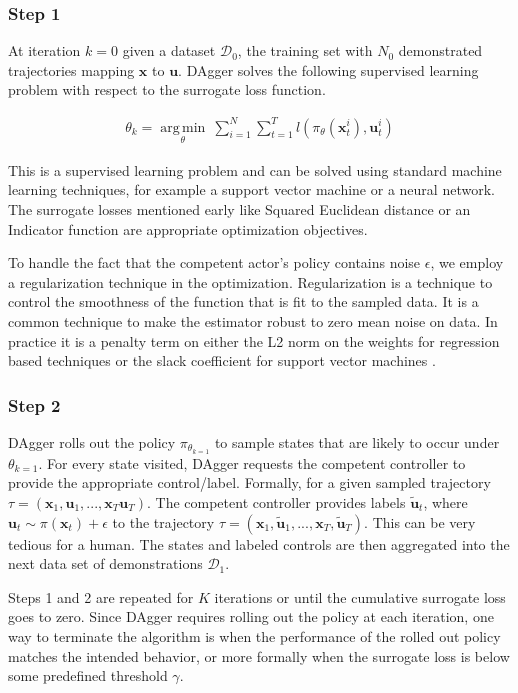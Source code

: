 \documentclass[10pt, conference]{ieeeconf}      %
\DeclareMathOperator*{\argmin}{arg\,min}
\newcommand{\bu}{\mathbf{u}}
\newcommand{\bx}{\mathbf{x}}
\begin{document}
\subsubsection{Step 1}
At iteration $k=0$ given a dataset $\mathcal{D}_0$, the training set with $N_0$ demonstrated trajectories mapping $\bx$ to $\bu$. DAgger solves the following supervised learning problem with respect to the surrogate loss function. 

 \vspace{-2ex}
\begin{align}\label{eq:super_objj}
\theta_{k} = \underset{\theta}{\argmin} \: \sum_{i=1}^{N}\sum_{t=1}^T l(\pi_{\theta}(\bx_t^{i}),\bu_{t}^i)
\end{align}
 
 
This is a supervised learning problem and can be solved using standard machine learning techniques, for example a support vector machine or a neural network. The surrogate losses mentioned early like Squared Euclidean distance or an Indicator function are appropriate optimization objectives. 
 
 To handle the fact that the competent actor's policy contains noise $\epsilon$, we employ a regularization technique in the optimization. Regularization is a technique to control the smoothness of the function that is fit to the sampled data. It is a common technique to make the estimator robust to zero mean noise on data. In practice it is a penalty term on either  the L2 norm on the weights for regression based techniques or the slack coefficient for support vector machines \cite{scholkopf2002learning}.
 
 \subsubsection{Step 2}
DAgger rolls out the policy $\pi_{\theta_{k=1}}$ to sample states that are likely to occur under $\theta_{k=1}$. For every state visited, DAgger requests the competent controller to provide the appropriate control/label. Formally, for a given sampled trajectory  $\tau = (\bx_1,\bu_1,...,\bx_T\bu_T )$. The competent controller provides labels $\tilde{\bu}_t$, where $\bu_t \sim \pi(\bx_t) + \epsilon$ to the trajectory $\tau = (\bx_1,\tilde{\bu}_1,...,\bx_T, \tilde{\bu}_T )$.  This can be very tedious for a human. The states and labeled controls are then aggregated into the next data set of demonstrations $\mathcal{D}_1$. 


Steps 1 and 2 are repeated for $K$ iterations or until the cumulative surrogate loss  goes to zero. Since DAgger requires rolling out the policy at each iteration, one way to terminate the algorithm is when the performance of the rolled out policy matches the intended behavior, or more formally when the surrogate loss is below some predefined threshold $\gamma$.  
\end{document}
